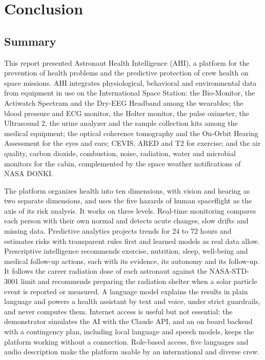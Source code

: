 \section{Conclusion}
\label{sec:conclusion}

\subsection{Summary}
\label{subsec:summary}

This report presented Astronaut Health Intelligence (AHI), a platform for the prevention of health problems and the predictive protection of crew health on space missions. AHI integrates physiological, behavioral and environmental data from equipment in use on the International Space Station: the Bio-Monitor, the Actiwatch Spectrum and the Dry-EEG Headband among the wearables; the blood pressure and ECG monitor, the Holter monitor, the pulse oximeter, the Ultrasound 2, the urine analyzer and the sample collection kits among the medical equipment; the optical coherence tomography and the On-Orbit Hearing Assessment for the eyes and ears; CEVIS, ARED and T2 for exercise; and the air quality, carbon dioxide, combustion, noise, radiation, water and microbial monitors for the cabin, complemented by the space weather notifications of NASA DONKI.

The platform organizes health into ten dimensions, with vision and hearing as two separate dimensions, and uses the five hazards of human spaceflight as the axis of its risk analysis. It works on three levels. Real-time monitoring compares each person with their own normal and detects acute changes, slow drifts and missing data. Predictive analytics projects trends for 24 to 72 hours and estimates risks with transparent rules first and learned models as real data allow. Prescriptive intelligence recommends exercise, nutrition, sleep, well-being and medical follow-up actions, each with its evidence, its autonomy and its follow-up. It follows the career radiation dose of each astronaut against the NASA-STD-3001 limit and recommends preparing the radiation shelter when a solar particle event is reported or measured. A language model explains the results in plain language and powers a health assistant by text and voice, under strict guardrails, and never computes them. Internet access is useful but not essential: the demonstrator simulates the AI with the Claude API, and an on board backend with a contingency plan, including local language and speech models, keeps the platform working without a connection. Role-based access, five languages and audio description make the platform usable by an international and diverse crew.

